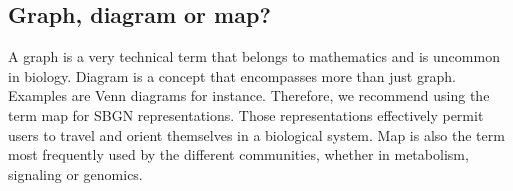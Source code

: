 \subsection{Graph, diagram or map?}

A graph is a very technical term that belongs to mathematics and is uncommon in biology. Diagram is a concept that encompasses more than just graph. Examples are Venn diagrams for instance. Therefore, we recommend using the term map for SBGN representations. Those representations effectively permit users to travel and orient themselves in a biological system. Map is also the term most frequently used by the different communities, whether in metabolism, signaling or genomics.


